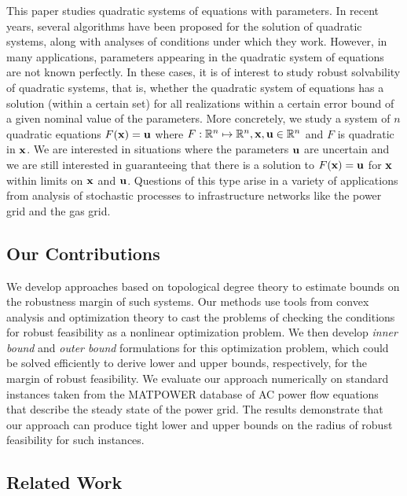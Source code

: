 This paper studies quadratic systems of equations with parameters.
In recent years, several algorithms have been proposed for the solution of quadratic systems, along with analyses of conditions under which they work. 
However, in many applications, parameters appearing in the quadratic system of equations are not known perfectly.
In these cases, it is of interest to study robust solvability of quadratic systems, that is, whether the quadratic system of equations has a solution (within a certain set) for all realizations within a certain error bound of a given nominal value of the parameters.
  More concretely, we study a system of $n$ quadratic equations $F(\bold x)=\bold u$ where $F: \mathbb{R}^n \mapsto \mathbb{R}^n,\bold  x,\bold u \in \mathbb{R}^n$ and $F$ is quadratic in $\bold x$.
  We are interested in situations where the parameters $\bold u$ are uncertain and we are still interested in guaranteeing that there is a solution to $F(\bold x) = \bold u$ for $\bold x$ within limits on $\bold x$ and $\bold u$.
  Questions of this type arise in a variety of applications from analysis of stochastic processes to infrastructure networks like the power grid and the gas grid.
\subsection{Our Contributions}
We develop approaches based on topological degree theory to estimate bounds on the robustness margin of such systems.
  Our methods use tools from convex analysis and optimization theory to cast the problems of checking the conditions for robust feasibility as a nonlinear optimization problem.
  We then develop \emph{inner bound} and \emph{outer bound} formulations for this optimization problem, which could be solved efficiently to derive lower and upper bounds, respectively, for the margin of robust feasibility.
  We evaluate our approach numerically on standard instances taken from the MATPOWER database of AC power flow equations that describe the steady state of the power grid.
  The results demonstrate that our approach can produce tight lower and upper bounds on the radius of robust feasibility for such instances.

\subsection{Related Work}

  

